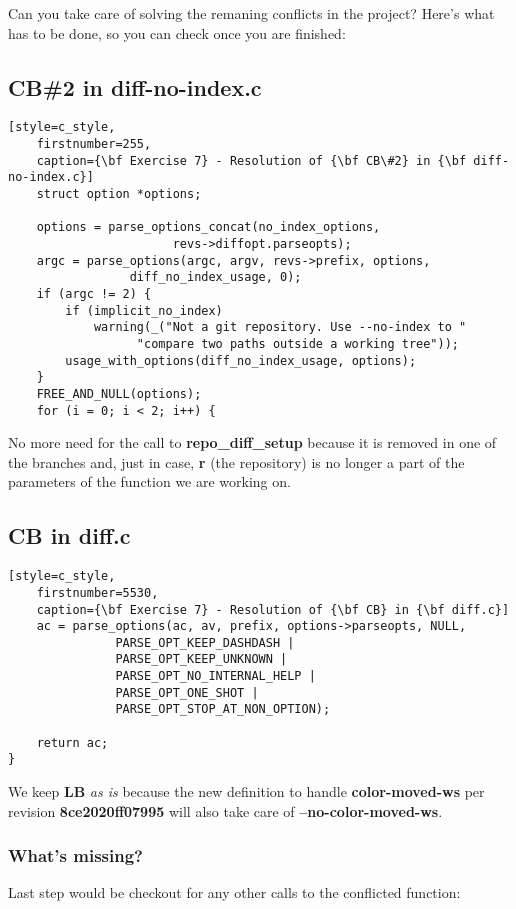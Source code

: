 Can you take care of solving the remaning conflicts in the project? Here's what has to be done, so you can check once you are finished:

\subsection*{CB\#2 in diff-no-index.c}
\begin{lstlisting}[style=c_style,
	firstnumber=255,
	caption={\bf Exercise 7} - Resolution of {\bf CB\#2} in {\bf diff-no-index.c}]
	struct option *options;

	options = parse_options_concat(no_index_options,
				       revs->diffopt.parseopts);
	argc = parse_options(argc, argv, revs->prefix, options,
			     diff_no_index_usage, 0);
	if (argc != 2) {
		if (implicit_no_index)
			warning(_("Not a git repository. Use --no-index to "
				  "compare two paths outside a working tree"));
		usage_with_options(diff_no_index_usage, options);
	}
	FREE_AND_NULL(options);
	for (i = 0; i < 2; i++) {
\end{lstlisting}

No more need for the call to {\bf repo\_diff\_setup} because it is removed in one of the branches and, just in case,
{\bf r} (the repository) is no longer a part of the parameters of the function we are working on.

\subsection*{CB in diff.c}

\begin{lstlisting}[style=c_style,
	firstnumber=5530,
	caption={\bf Exercise 7} - Resolution of {\bf CB} in {\bf diff.c}]
	ac = parse_options(ac, av, prefix, options->parseopts, NULL,
			   PARSE_OPT_KEEP_DASHDASH |
			   PARSE_OPT_KEEP_UNKNOWN |
			   PARSE_OPT_NO_INTERNAL_HELP |
			   PARSE_OPT_ONE_SHOT |
			   PARSE_OPT_STOP_AT_NON_OPTION);

	return ac;
}
\end{lstlisting}

We keep {\bf LB} {\it as is} because the new definition to handle {\bf color-moved-ws} per revision {\bf 8ce2020ff07995} will
also take care of {\bf --no-color-moved-ws}.

\subsubsection{What's missing?}
Last step would be checkout for any other calls to the conflicted function:

